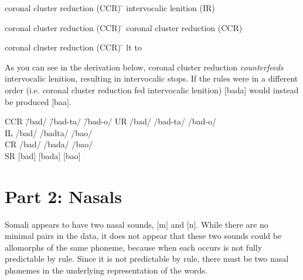 \documentclass[doc,12pt]{apa6}
\begin{document}
\begin{exe}

	\ex \begin{tabbing}
		coronal cluster reduction (CCR) \= \kill
		intervocalic lenition (IR) \>
		\end{tabbing}

	\ex \begin{tabbing}
		coronal cluster reduction (CCR) \= \kill
		coronal cluster reduction (CCR) \>
		\phonl{\phonfeat{+cor\\-son}}{
		       $\emptyset$}{
		       \phonfeat{+cor\\-son}}
		\end{tabbing}

	\ex \begin{tabbing}
		coronal cluster reduction (CCR) \= \kill
		lt to \textipa{S} \>
		\phon{lt}{\textipa{S}}
	\end{tabbing}

\end{exe}

As you can see in the derivation below, coronal cluster reduction
\emph{counterfeeds} intervocalic lenition, resulting in intervocalic stops.
If the rules were in a different order (i.e. coronal cluster reduction fed
intervocalic lenition) {[}bada{]} would instead be produced
{[}baa{]}.

\begin{exe}
	\ex \begin{tabbing}
		CCR \hspace{2em} \= /bad/ \hspace{2em}
		\= /bad-ta/ \hspace{2em} \= /bad-o/ \kill
		UR  \> /bad/ \> /bad-ta/ \> /bad-o/          \\
		IL  \> /bad/ \> /badta/  \> /bao/ \\
		CR \> /bad/ \> /bada/   \> /bao/ \\
		SR  \> {[}bad{]} \> {[}bada{]} \> {[}ba\textipa{D}o{]}
		\end{tabbing}
\end{exe}

\section{Part 2: Nasals}

Somali appears to have two nasal sounds, {[}m{]} and {[}n{]}. While there are
no minimal pairs in the data, it does not appear that these two sounds could be
allomorphs of the same phoneme, because when each occurs is not fully
predictable by rule. Since it is not predictable by rule, there must be two 
nasal phonemes in the underlying representation of the words.
\end{document}
